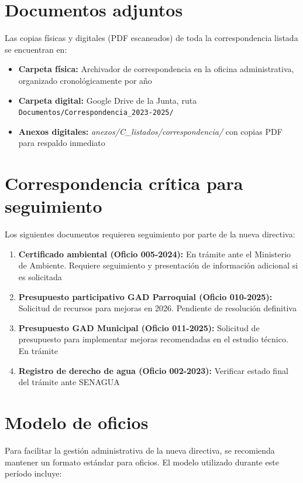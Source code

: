 \section*{Documentos adjuntos}

Las copias físicas y digitales (PDF escaneados) de toda la correspondencia listada se encuentran en:

\begin{itemize}
  \item \textbf{Carpeta física:} Archivador de correspondencia en la oficina administrativa, organizado cronológicamente por año
  \item \textbf{Carpeta digital:} Google Drive de la Junta, ruta \texttt{Documentos/Correspondencia\_2023-2025/}
  \item \textbf{Anexos digitales:} \emph{anexos/C\_listados/correspondencia/} con copias PDF para respaldo inmediato
\end{itemize}

\section*{Correspondencia crítica para seguimiento}

Los siguientes documentos requieren seguimiento por parte de la nueva directiva:

\begin{enumerate}
  \item \textbf{Certificado ambiental (Oficio 005-2024):} En trámite ante el Ministerio de Ambiente. Requiere seguimiento y presentación de información adicional si es solicitada
  \item \textbf{Presupuesto participativo GAD Parroquial (Oficio 010-2025):} Solicitud de recursos para mejoras en 2026. Pendiente de resolución definitiva
  \item \textbf{Presupuesto GAD Municipal (Oficio 011-2025):} Solicitud de presupuesto para implementar mejoras recomendadas en el estudio técnico. En trámite
  \item \textbf{Registro de derecho de agua (Oficio 002-2023):} Verificar estado final del trámite ante SENAGUA
\end{enumerate}

\section*{Modelo de oficios}

Para facilitar la gestión administrativa de la nueva directiva, se recomienda mantener un formato estándar para oficios. El modelo utilizado durante este período incluye:

